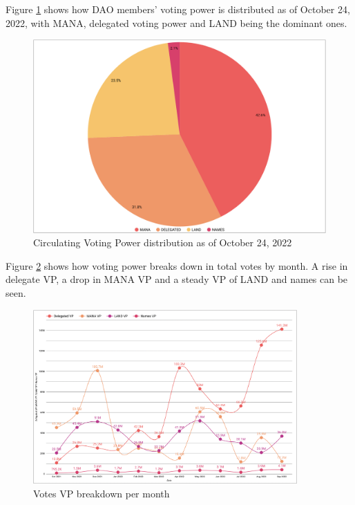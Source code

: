 \documentclass[MSE,Master,english]{twbook}%
\begin{document}
Figure \ref{fig:vp_distribution} shows how \gls{DAO} members' voting power is distributed as of October 24, 2022, with \gls{MANA}, delegated voting power and \gls{LAND} being the dominant ones.
\begin{figure}[H]
  \centering
  \includegraphics[width=\textwidth]{metrics/vp_distribution.png}
  \caption{Circulating Voting Power distribution as of October 24, 2022}
  \label{fig:vp_distribution}
\end{figure}

Figure \ref{fig:votes_vp} shows how voting power breaks down in total votes by month. A rise in delegate VP, a drop in \gls{MANA} VP and a steady VP of \gls{LAND} and names can be seen.
\begin{figure}[H]
  \centering
  \includegraphics[width=0.9\textwidth]{metrics/votes_breakdown.png}
  \caption{Votes VP breakdown per month}
  \label{fig:votes_vp}
\end{figure}
\end{document}
